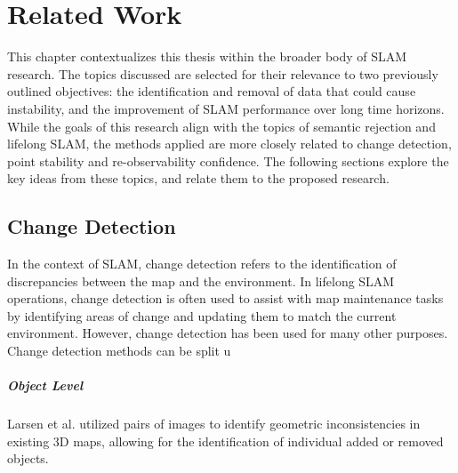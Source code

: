 \section{Related Work}
\label{sec:related_work}

This chapter contextualizes this thesis within the broader body of SLAM research. The topics discussed are selected for their relevance to two previously outlined objectives: the identification and removal of data that could cause instability, and the improvement of SLAM performance over long time horizons. While the goals of this research align with the topics of semantic rejection and lifelong SLAM, the methods applied are more closely related to change detection, point stability and re-observability confidence. The following sections explore the key ideas from these topics, and relate them to the proposed research.

\subsection{Change Detection}

In the context of SLAM, change detection refers to the identification of discrepancies between the map and the environment. In lifelong SLAM operations, change detection is often used to assist with map maintenance tasks by identifying areas of change and updating them to match the current environment. However, change detection has been used for many other purposes. Change detection methods can be split u

\subparagraph{Object Level}
Larsen et al. \cite{larsenChangeDetectionModel} utilized pairs of images to identify geometric inconsistencies in existing 3D maps, allowing for the identification of individual added or removed objects.




